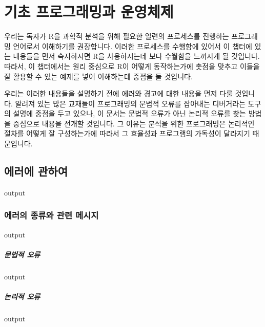 \documentclass{book}
\begin{document}
\chapter{기초 프로그래밍과 운영체제}

우리는 독자가 R을 과학적 분석을 위해 필요한 일련의 프로세스를 진행하는 프로그래밍 언어로서 이해하기를 권장합니다.
이러한 프로세스를 수행함에 있어서 이 챕터에 있는 내용들을 먼저 숙지하시면 R을 사용하시는데 보다 수월함을 느끼시게 될 것입니다. 
따라서, 이 챕터에서는 원리 중심으로 R이 어떻게 동작하는가에 촛점을 맞추고 이들을 잘 활용할 수 있는 예제를 넣어 이해하는데 중점을 둘 것입니다. 

우리는 이러한 내용들을 설명하기 전에 에러와 경고에 대한 내용을 먼저 다룰 것입니다. 
알려져 있는 많은 교재들이 프로그래밍의 문법적 오류를 잡아내는 디버거라는 도구의 설명에 중점을 두고 있으나, 이 문서는 문법적 오류가 아닌 논리적 오류를 찾는 방법을 중심으로 내용을 전개할 것입니다. 
그 이유는 분석을 위한 프로그래밍은 논리적인 절차를 어떻게 잘 구성하는가에 따라서 그 효율성과 프로그램의 가독성이 달라지기 때문입니다. 

\section{에러에 관하여}
\begin{Schunk}
\begin{Soutput}
output
\end{Soutput}
\end{Schunk}


\subsection{에러의 종류와 관련 메시지}

\begin{Schunk}
\begin{Soutput}
output
\end{Soutput}
\end{Schunk}

\paragraph{문법적 오류}
\begin{Schunk}
\begin{Soutput}
output
\end{Soutput}
\end{Schunk}

\paragraph{논리적 오류}
\begin{Schunk}
\begin{Soutput}
output
\end{Soutput}
\end{Schunk}
\end{document}
